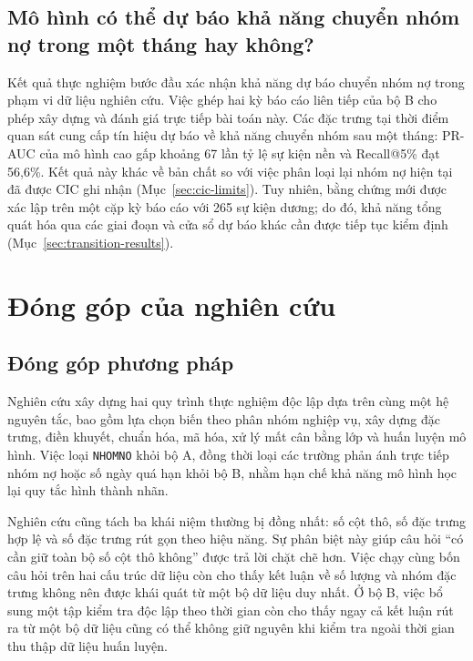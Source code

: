 \subsection{Mô hình có thể dự báo khả năng chuyển nhóm nợ trong một tháng hay không?}

Kết quả thực nghiệm bước đầu xác nhận khả năng dự báo chuyển nhóm nợ trong phạm vi dữ liệu nghiên cứu. Việc ghép hai kỳ báo cáo liên tiếp của bộ B cho phép xây dựng và đánh giá trực tiếp bài toán này. Các đặc trưng tại thời điểm quan sát cung cấp tín hiệu dự báo về khả năng chuyển nhóm sau một tháng: PR-AUC của mô hình cao gấp khoảng 67 lần tỷ lệ sự kiện nền và Recall@5\% đạt 56,6\%. Kết quả này khác về bản chất so với việc phân loại lại nhóm nợ hiện tại đã được CIC ghi nhận (Mục~\ref{sec:cic-limits}). Tuy nhiên, bằng chứng mới được xác lập trên một cặp kỳ báo cáo với 265 sự kiện dương; do đó, khả năng tổng quát hóa qua các giai đoạn và cửa sổ dự báo khác cần được tiếp tục kiểm định (Mục~\ref{sec:transition-results}).

\section{Đóng góp của nghiên cứu}

\subsection{Đóng góp phương pháp}

Nghiên cứu xây dựng hai quy trình thực nghiệm độc lập dựa trên cùng một hệ nguyên tắc, bao gồm lựa chọn biến theo phân nhóm nghiệp vụ, xây dựng đặc trưng, điền khuyết, chuẩn hóa, mã hóa, xử lý mất cân bằng lớp và huấn luyện mô hình. Việc loại \texttt{NHOMNO} khỏi bộ A, đồng thời loại các trường phản ánh trực tiếp nhóm nợ hoặc số ngày quá hạn khỏi bộ B, nhằm hạn chế khả năng mô hình học lại quy tắc hình thành nhãn.

Nghiên cứu cũng tách ba khái niệm thường bị đồng nhất: số cột thô, số đặc trưng hợp lệ và số đặc trưng rút gọn theo hiệu năng. Sự phân biệt này giúp câu hỏi ``có cần giữ toàn bộ số cột thô không'' được trả lời chặt chẽ hơn. Việc chạy cùng bốn câu hỏi trên hai cấu trúc dữ liệu còn cho thấy kết luận về số lượng và nhóm đặc trưng không nên được khái quát từ một bộ dữ liệu duy nhất. Ở bộ B, việc bổ sung một tập kiểm tra độc lập theo thời gian còn cho thấy ngay cả kết luận rút ra từ một bộ dữ liệu cũng có thể không giữ nguyên khi kiểm tra ngoài thời gian thu thập dữ liệu huấn luyện.

